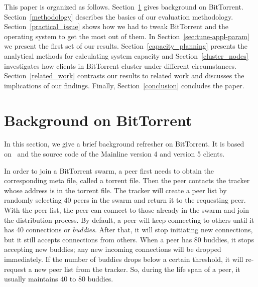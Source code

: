 \documentclass[10pt,letterpaper,twocolumn]{article}
\begin{document}
This paper is organized as follows. Section~\ref{background} gives
background on BitTorrent. Section~\ref{methodology} describes the
basics of our evaluation methodology. Section~\ref{practical_issue}
shows how we had to tweak BitTorrent and the operating system to get
the most out of them. In Section~\ref{sec:tune-appl-param} we present
the first set of our results. Section~\ref{capacity_planning} presents
the analytical methods for calculating system capacity and
Section~\ref{cluster_nodes} investigates how clients in BitTorrent
cluster under different circumstances. Section~\ref{related_work}
contrasts our results to related work and discusses the implications
of our findings. Finally, Section~\ref{conclusion} concludes the
paper.













































\section{Background on BitTorrent}
\label{background}

In this section, we give a brief background refresher on
BitTorrent. It is based on~\cite{cohen03} and the source code of the
Mainline version 4 and version 5 clients.

In order to join a BitTorrent swarm, a peer first needs to obtain the
corresponding meta file, called a torrent file. Then the peer contacts
the tracker whose address is in the torrent file. The
tracker will create a peer list by randomly selecting 40 peers in the
swarm and return it to the requesting peer. With the peer list, the
peer can connect to those already in the swarm and join the
distribution process. By default, a peer will keep connecting to
others until it has 40 connections or \textit{buddies}. After that, it
will stop initiating new connections, but it still accepts connections
from others. When a peer has 80 buddies, it stops accepting new
buddies; any new incoming connections will be dropped immediately. If
the number of buddies drops below a certain threshold, it will
re-request a new peer list from the tracker. So, during the life span
of a peer, it usually maintains 40 to 80 buddies.
\end{document}
